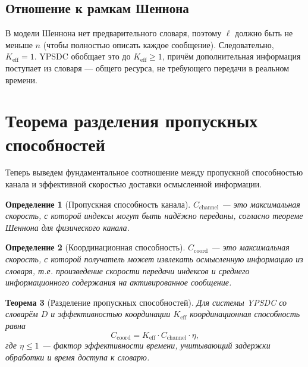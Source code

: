 \documentclass[12pt,a4paper]{article}
\newtheorem{theorem}{Теорема}[section]
\newtheorem{definition}[theorem]{Определение}
\theoremstyle{remark}
\newcommand{\Keff}{K_{\mathrm{eff}}}
\begin{document}
	\subsection{Отношение к рамкам Шеннона}
	
	В модели Шеннона нет предварительного словаря, поэтому $\ell$ должно быть не меньше $n$ (чтобы полностью описать каждое сообщение). Следовательно, $\Keff = 1$. YPSDC обобщает это до $\Keff \ge 1$, причём дополнительная информация поступает из словаря — общего ресурса, не требующего передачи в реальном времени.
	
	\section{Теорема разделения пропускных способностей}
	\label{sec:separation}
	
	Теперь выведем фундаментальное соотношение между пропускной способностью канала и эффективной скоростью доставки осмысленной информации.
	
	\begin{definition}[Пропускная способность канала]
		$C_{\text{channel}}$ — это максимальная скорость, с которой индексы могут быть надёжно переданы, согласно теореме Шеннона для физического канала.
	\end{definition}
	
	\begin{definition}[Координационная способность]
		$C_{\text{coord}}$ — это максимальная скорость, с которой получатель может извлекать осмысленную информацию из словаря, т.е. произведение скорости передачи индексов и среднего информационного содержания на активированное сообщение.
	\end{definition}
	
	\begin{theorem}[Разделение пропускных способностей]
		Для системы YPSDC со словарём $D$ и эффективностью координации $\Keff$ координационная способность равна
		\begin{equation}
			C_{\text{coord}} = \Keff \cdot C_{\text{channel}} \cdot \eta,
			\label{eq:capacity-separation}
		\end{equation}
		где $\eta \le 1$ — фактор эффективности времени, учитывающий задержки обработки и время доступа к словарю.
	\end{theorem}
	
\end{document}
